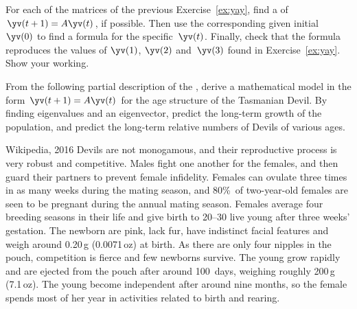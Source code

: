 \begin{exercise} \label{ex:} 
For each of the matrices of the previous Exercise~\ref{ex:yay}, find a  of \(\yv(t+1)=A\yv(t)\), if possible.
Then use the corresponding given initial~\(\yv(0)\) to find a formula for the specific~\(\yv(t)\).
Finally, check that the formula reproduces the values of \(\yv(1)\), \(\yv(2)\) and~\(\yv(3)\) found in Exercise~\ref{ex:yay}.
Show your working.
\end{exercise}






\begin{exercise} \label{ex:} 
From the following partial description of the , 
derive a mathematical model in the form \(\yv(t+1)=A\yv(t)\) for the age structure of the Tasmanian Devil.
By finding eigenvalues and an eigenvector, predict the long-term growth of the population, and predict the long-term relative numbers of Devils of various ages.
\begin{quoted}{Wikipedia, 2016}
Devils are not monogamous, and their reproductive process is very robust and competitive. Males fight one another for the females, and then guard their partners to prevent female infidelity. Females can ovulate three times in as many weeks during the mating season, and 80\%~of two-year-old females are seen to be pregnant during the annual mating season. Females average four breeding seasons in their life and give birth to 20--30 live young after three weeks' gestation. The newborn are pink, lack fur, have indistinct facial features and weigh around 0.20\,g (0.0071\,oz) at birth. As there are only four nipples in the pouch, competition is fierce and few newborns survive. The young grow rapidly and are ejected from the pouch after around 100~days, weighing roughly 200\,g (7.1\,oz). The young become independent after around nine months, so the female spends most of her year in activities related to birth and rearing.
\end{quoted}
\end{exercise}







